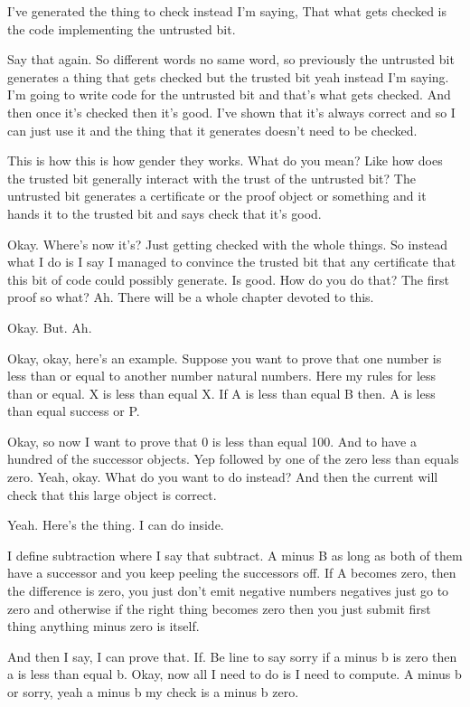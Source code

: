 \begin{subappendices}
    I've generated the thing to check instead I'm saying, That what gets checked is the code implementing the untrusted bit. 
    
    Say that again. So different words no same word, so previously the untrusted bit generates a thing that gets checked but the trusted bit yeah instead I'm saying. I'm going to write code for the untrusted bit and that's what gets checked. And then once it's checked then it's good. I've shown that it's always correct and so I can just use it and the thing that it generates doesn't need to be checked. 
    
    This is how this is how gender they works. What do you mean? Like how does the trusted bit generally interact with the trust of the untrusted bit? The untrusted bit generates a certificate or the proof object or something and it hands it to the trusted bit and says check that it's good. 
    
    Okay. Where's now it's? Just getting checked with the whole things. So instead what I do is I say I managed to convince the trusted bit that any certificate that this bit of code could possibly generate. Is good. How do you do that? The first proof so what? Ah. There will be a whole chapter devoted to this. 
    
    Okay. But. Ah. 
    
    Okay, okay, here's an example. Suppose you want to prove that one number is less than or equal to another number natural numbers. Here my rules for less than or equal. X is less than equal X. If A is less than equal B then. A is less than equal success or P. 
    
    Okay, so now I want to prove that 0 is less than equal 100. And to have a hundred of the successor objects. Yep followed by one of the zero less than equals zero. Yeah, okay. What do you want to do instead? And then the current will check that this large object is correct. 
    
    Yeah. Here's the thing. I can do inside. 
    
    I define subtraction where I say that subtract. A minus B as long as both of them have a successor and you keep peeling the successors off. If A becomes zero, then the difference is zero, you just don't emit negative numbers negatives just go to zero and otherwise if the right thing becomes zero then you just submit first thing anything minus zero is itself. 
    
    And then I say, I can prove that. If. Be line to say sorry if a minus b is zero then a is less than equal b. Okay, now all I need to do is I need to compute. A minus b or sorry, yeah a minus b my check is a minus b zero. 
    

\end{subappendices}
